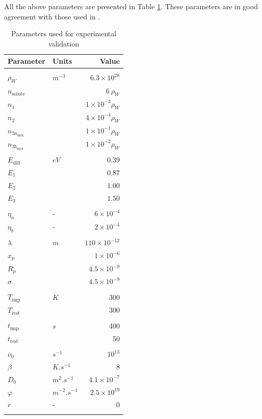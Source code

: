 All the above parameters are presented in Table \ref{tab:parameters validation}. These parameters are in good agreement with those used in .
\begin{table} [ht]
    \centering
    \begin{tabular}{p{2.3cm} p{2cm} r}
        Parameter & Units & Value \\
        \hline
        \\
        $\rho_W$ & $\si{m^{-3}}$ &$6.3 \times 10^{28}$ \\
        $n_\mathrm{solute}$ & & $6 \:\rho_W$\\
        $n_1$ & & $1 \times 10 ^{-3} \rho_W$ \\
        $n_2$ &  & $4 \times 10 ^{-4} \rho_W$ \\
        $n_{3a_\mathrm{max}}$ & & $1 \times 10 ^{-1} \rho_W$ \\
        $n_{3b_\mathrm{max}}$ & & $1 \times 10 ^{-2} \rho_W$ \\
        \\
        $E_\mathrm{diff}$ & $\si{eV}$ & $0.39$ \\
        $E_1$ &  & $0.87$ \\
        $E_2$ &  & $1.00$ \\
        $E_3$ &  & $1.50$ \\
        \\
        $\eta_a$ & - & $6 \times 10 ^{-4}$ \\
        $\eta_b$ & - & $2 \times 10 ^{-4}$ \\
        \\
        $\lambda$ & $\si{m}$ & $110 \times 10 ^{-12}$  \\
        $x_p$ & & $1 \times 10 ^{-6}$ \\
        $R_p$ & & $4.5 \times 10^{-9}$ \\
        $\sigma$ & & $4.5 \times 10^{-9}$ \\
        \\
        $T_\mathrm{imp}$ & $\si{K}$ & 300 \\
        $T_\mathrm{rest}$ & & 300 \\
        \\
        $t_\mathrm{imp}$ & $\si{s}$ & 400 \\
        $t_\mathrm{rest}$ & & 50 \\
        \\
        $\nu_0$ & $\si{s^{-1}}$ & $10 ^{13}$ \\
        $\beta$ & $\si{K.s^{-1}}$ & 8 \\
        $D_0$ & $\si{m^2.s^{-1}}$ & $4.1 \times 10 ^{-7}$ \\
        $\varphi$ & $\si{m^{-2}.s^{-1}}$ & $2.5 \times 10 ^{19}$ \\
        $r$ & - & 0 \\
        \\
    \end{tabular}
    \caption{Parameters used for experimental validation}
    \label{tab:parameters validation}
\end{table}

